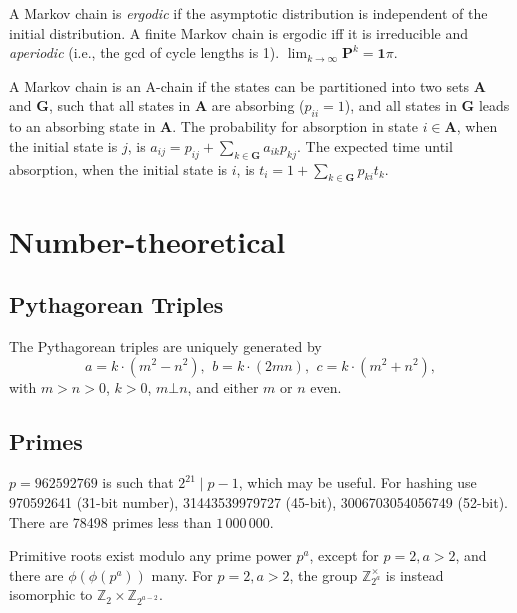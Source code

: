 {%
A Markov chain is \emph{ergodic} if the asymptotic distribution is independent of the initial distribution.
A finite Markov chain is ergodic iff it is irreducible and \emph{aperiodic} (i.e., the gcd of cycle lengths is 1).
$\lim_{k\rightarrow\infty}\mathbf{P}^k = \mathbf{1}\pi$.

A Markov chain is an A-chain if the states can be partitioned into two sets $\mathbf{A}$ and $\mathbf{G}$, such that all states in $\mathbf{A}$ are absorbing ($p_{ii}=1$), and all states in $\mathbf{G}$ leads to an absorbing state in $\mathbf{A}$.
The probability for absorption in state $i\in\mathbf{A}$, when the initial state is $j$, is $a_{ij} = p_{ij}+\sum_{k\in\mathbf{G}} a_{ik}p_{kj}$.
The expected time until absorption, when the initial state is $i$, is $t_i = 1+\sum_{k\in\mathbf{G}}p_{ki}t_k$.


\section{Number-theoretical}

\subsection{Pythagorean Triples}
 The Pythagorean triples are uniquely generated by
 $$a=k\cdot (m^{2}-n^{2}),\ \,b=k\cdot (2mn),\ \,c=k\cdot (m^{2}+n^{2}),$$
 with $m > n > 0$, $k > 0$, $m \bot n$, and either $m$ or $n$ even.

\subsection{Primes}
	$p=962592769$ is such that $2^{21} \mid p-1$, which may be useful. For hashing
	use 970592641 (31-bit number), 31443539979727 (45-bit), 3006703054056749
	(52-bit). There are 78498 primes less than $1\,000\,000$.

	Primitive roots exist modulo any prime power $p^a$, except for $p = 2, a > 2$, and there are $\phi(\phi(p^a))$ many.
	For $p = 2, a > 2$, the group ${\mathbb Z}_{2^a}^\times$ is instead isomorphic to ${\mathbb Z}_2 \times {\mathbb Z}_{2^{a-2}}$.

}
